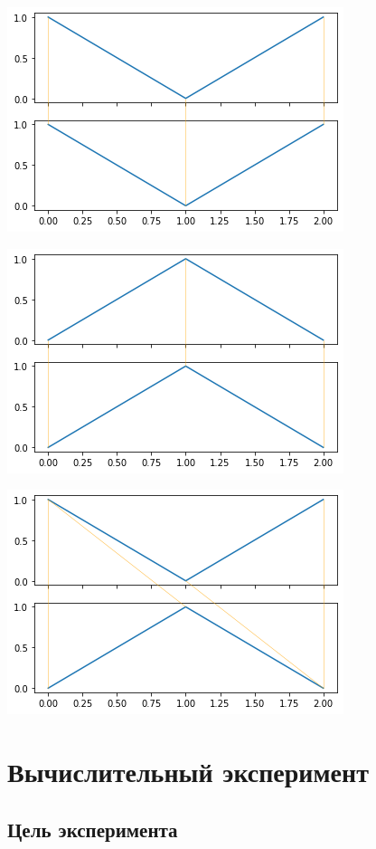 \documentclass[12pt, twoside]{article}
\begin{document}
\includegraphics{sample22}

\includegraphics{sample23}

\includegraphics{sample24}



\section{Вычислительный эксперимент}

\subsection{Цель эксперимента}
\end{document}
